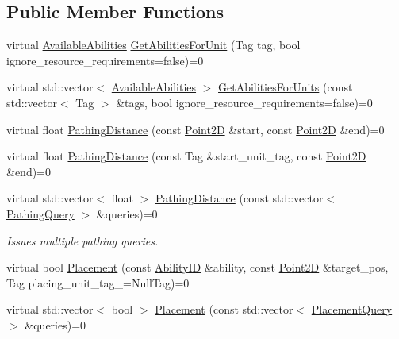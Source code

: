\subsection*{Public Member Functions}
\begin{DoxyCompactItemize}
\item 
virtual \hyperlink{structsc2_1_1_available_abilities}{Available\+Abilities} \hyperlink{classsc2_1_1_query_interface_a6954d65b93a07bf14e2a8818f9df9b8c}{Get\+Abilities\+For\+Unit} (Tag tag, bool ignore\+\_\+resource\+\_\+requirements=false)=0
\item 
virtual std\+::vector$<$ \hyperlink{structsc2_1_1_available_abilities}{Available\+Abilities} $>$ \hyperlink{classsc2_1_1_query_interface_a6add52c8b04f0e50efdd83955952b76f}{Get\+Abilities\+For\+Units} (const std\+::vector$<$ Tag $>$ \&tags, bool ignore\+\_\+resource\+\_\+requirements=false)=0
\item 
virtual float \hyperlink{classsc2_1_1_query_interface_adf72c7556e59e82e231d9c58bd093546}{Pathing\+Distance} (const \hyperlink{structsc2_1_1_point2_d}{Point2D} \&start, const \hyperlink{structsc2_1_1_point2_d}{Point2D} \&end)=0
\item 
virtual float \hyperlink{classsc2_1_1_query_interface_a1a7216c7ad37273dc54e12a92fee7a64}{Pathing\+Distance} (const Tag \&start\+\_\+unit\+\_\+tag, const \hyperlink{structsc2_1_1_point2_d}{Point2D} \&end)=0
\item 
\mbox{\label{classsc2_1_1_query_interface_ae23848466df99bfb7c3da9fbabc7f47b}} 
virtual std\+::vector$<$ float $>$ \hyperlink{classsc2_1_1_query_interface_ae23848466df99bfb7c3da9fbabc7f47b}{Pathing\+Distance} (const std\+::vector$<$ \hyperlink{structsc2_1_1_query_interface_1_1_pathing_query}{Pathing\+Query} $>$ \&queries)=0
\begin{DoxyCompactList}\small\item\em Issues multiple pathing queries. \end{DoxyCompactList}\item 
virtual bool \hyperlink{classsc2_1_1_query_interface_ae78a9660fc9f03b1676bacf47c9a9180}{Placement} (const \hyperlink{classsc2_1_1_s_c2_type}{Ability\+ID} \&ability, const \hyperlink{structsc2_1_1_point2_d}{Point2D} \&target\+\_\+pos, Tag placing\+\_\+unit\+\_\+tag\+\_\+=Null\+Tag)=0
\item 
virtual std\+::vector$<$ bool $>$ \hyperlink{classsc2_1_1_query_interface_a470e79785e2ffdb1a5c4636c8a070601}{Placement} (const std\+::vector$<$ \hyperlink{structsc2_1_1_query_interface_1_1_placement_query}{Placement\+Query} $>$ \&queries)=0
\end{DoxyCompactItemize}



